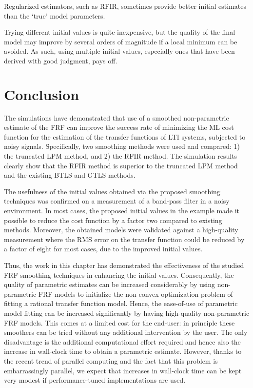 \begin{guideline}
\label{guide:initvals:try-regularization}
Regularized estimators, such as \gls{RFIR}, sometimes provide better initial estimates than the `true' model parameters.
\end{guideline}

\begin{guideline}
\label{guide:initvals:try-many-initial-values}
Trying different initial values is quite inexpensive, but the quality of the final model may improve by several orders of magnitude if a local minimum can be avoided.
As such, using multiple initial values, especially ones that have been derived with good judgment, pays off.
\end{guideline}

\section{Conclusion}
\label{sec:initial-values:Conclusion}
The simulations have demonstrated that use of a smoothed non-parametric estimate of the \gls{FRF} can improve the success rate of minimizing the \gls{ML} cost function for the estimation of the transfer functions of \gls{LTI} systems, subjected to noisy signals. Specifically, two smoothing methods were used and compared: 1) the truncated \gls{LPM} method, and 2) the \gls{RFIR} method. The simulation results clearly show that the \gls{RFIR} method is superior to the truncated \gls{LPM} method and the existing \gls{BTLS} and \gls{GTLS} methods.

The usefulness of the initial values obtained via the proposed smoothing techniques was confirmed on a measurement of a band-pass filter in a noisy environment.
In most cases, the proposed initial values in the example made it possible to reduce the cost function by a factor two compared to existing methods.
Moreover, the obtained models were validated against a high-quality measurement where the \gls{RMS} error on the transfer function could be reduced by a factor of eight for most cases, due to the improved initial values.

Thus, the work in this chapter has demonstrated the effectiveness of the studied \gls{FRF} smoothing techniques in enhancing the initial values.
Consequently, the quality of parametric estimates can be increased considerably by using non-parametric \gls{FRF} models to initialize the non-convex optimization problem of fitting a rational transfer function model.
Hence, the ease-of-use of parametric model fitting can be increased significantly by having high-quality non-parametric \gls{FRF} models.
This comes at a limited cost for the end-user: in principle these smoothers can be tried without any additional intervention by the user.
The only disadvantage is the additional computational effort required and hence also the increase in wall-clock time to obtain a parametric estimate.
However, thanks to the recent trend of parallel computing and the fact that this problem is embarrassingly parallel, we expect that increases in wall-clock time can be kept very modest if performance-tuned implementations are used.
